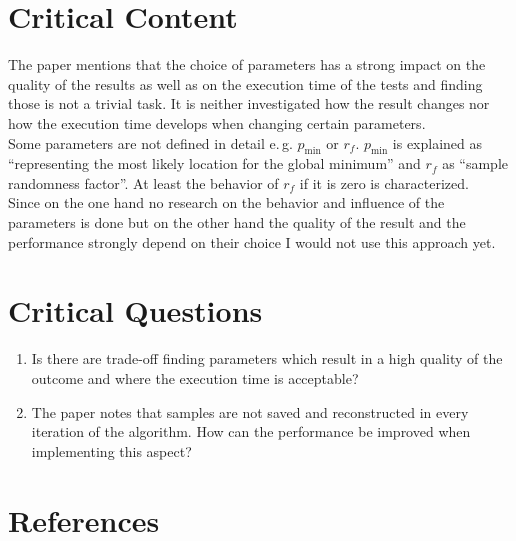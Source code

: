 \documentclass[oneside, notitlepage, twocolumn]{scrartcl}
\newcommand{\eg}{e.\,g.\xspace}
\begin{document}
\section{Critical Content}
The paper mentions that the choice of parameters has a strong impact on the quality of the results as well as on the execution time of the tests and finding those is not a trivial task.
It is neither investigated how the result changes nor how the execution time develops when changing certain parameters.\\
Some parameters are not defined in detail \eg{} \(p_\min\) or \(r_f\).
\(p_\min\) is explained as ``representing the most likely location for the global minimum'' and \(r_f\) as ``sample randomness factor''.
At least the behavior of \(r_f\) if it is zero is characterized.\\
Since on the one hand no research on the behavior and influence of the parameters is done but on the other hand the quality of the result and the performance strongly depend on their choice I would not use this approach yet.

\section{Critical Questions}
\begin{enumerate}
    \item Is there are trade-off finding parameters which result in a high quality of the outcome and where the execution time is acceptable?
    \item The paper notes that samples are not saved and reconstructed in every iteration of the algorithm.
        How can the performance be improved when implementing this aspect?
\end{enumerate}

\printglossary[type=\acronymtype, title=List of Abbreviations]

\section{References}
\begingroup
\renewcommand{\section}[2]{}%
\nocite{*}
\printbibliography%
\endgroup
\end{document}
